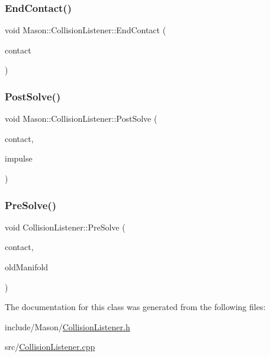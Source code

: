 \hypertarget{class_mason_1_1_collision_listener_a58250c23f5fe17721c186a9d22408576}{}\label{class_mason_1_1_collision_listener_a58250c23f5fe17721c186a9d22408576} 
\subsubsection{\texorpdfstring{End\+Contact()}{EndContact()}}
{\footnotesize\ttfamily void Mason\+::\+Collision\+Listener\+::\+End\+Contact (\begin{DoxyParamCaption}\item[{b2\+Contact $\ast$}]{contact }\end{DoxyParamCaption})\hspace{0.3cm}{\ttfamily [virtual]}}

\hypertarget{class_mason_1_1_collision_listener_a974aee4f4b2068706e87a887c842eb66}{}\label{class_mason_1_1_collision_listener_a974aee4f4b2068706e87a887c842eb66} 
\subsubsection{\texorpdfstring{Post\+Solve()}{PostSolve()}}
{\footnotesize\ttfamily void Mason\+::\+Collision\+Listener\+::\+Post\+Solve (\begin{DoxyParamCaption}\item[{b2\+Contact $\ast$}]{contact,  }\item[{const b2\+Contact\+Impulse $\ast$}]{impulse }\end{DoxyParamCaption})\hspace{0.3cm}{\ttfamily [virtual]}}

\hypertarget{class_mason_1_1_collision_listener_accc6ff23dcbf8cbef31e68fe3c56837a}{}\label{class_mason_1_1_collision_listener_accc6ff23dcbf8cbef31e68fe3c56837a} 
\subsubsection{\texorpdfstring{Pre\+Solve()}{PreSolve()}}
{\footnotesize\ttfamily void Collision\+Listener\+::\+Pre\+Solve (\begin{DoxyParamCaption}\item[{b2\+Contact $\ast$}]{contact,  }\item[{const b2\+Manifold $\ast$}]{old\+Manifold }\end{DoxyParamCaption})\hspace{0.3cm}{\ttfamily [virtual]}}



The documentation for this class was generated from the following files\+:\begin{DoxyCompactItemize}
\item 
include/\+Mason/\hyperlink{_collision_listener_8h}{Collision\+Listener.\+h}\item 
src/\hyperlink{_collision_listener_8cpp}{Collision\+Listener.\+cpp}\end{DoxyCompactItemize}
